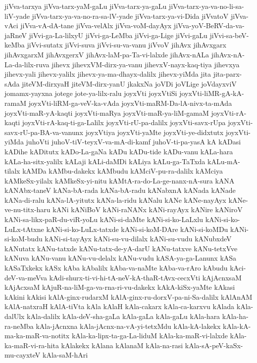 {jiVva-tarxya
jiVva-tarx-yaM-gaLu
jiVva-tarx-ya-gaLu
jiVva-tarx-ya-va-no-li-sa-liV-yade
jiVva-tarx-ya-va-no-ra-sa-lV-yade
jiVva-tarx-ya-vi-Dida
jiVvatoV
jiVva-vAci
jiVva-vA-dA-tane
jiVva-velAlx
jiVva-voM-dayAyx
jiVva-yoV-BeRV-da-va-jaRneV
jiVvi-ga-La-lilxyU
jiVvi-ga-LeMba
jiVvi-ga-Lige
jiVvi-gaLu
jiVvi-sa-beV-keMba
jiVvi-sutatx
jiVvi-suva
jiVvi-su-va-vanu
jiVvoV
jihAvx
jihAvxgarx
jihAvxgarxM
jihAvxgerxV
jihAvx-laM-pa-Ta-vi-lalxde
jihAvx-nALa
jihAvx-nA-La-da-lilx-ruva
jihevx
jihevxVM-dirx-ya-vanu
jihevxV-nayx-kaq-tiya
jihevxya
jihevx-yali
jihevx-yalilx
jihevx-ya-ma-dhayx-dalilx
jihevx-yiMda
jita
jita-parx-sAda
jiteVM-dirxyaH
jiteVM-dirx-yanU
jkakxNa
joVDi
joVLige
joVdayxviV
jomamx-yayxna
jotege
jote-ya-lilx-ralu
joyxVti
joyxVtiSi
joyxVti-liMR-gA-kA-ramaM
joyxVti-liRM-ga-veV-ka-vAda
joyxVti-maRM-Da-lA-nivx-ta-mAda
joyxVti-maR-yA-kaqti
joyxVti-maRya
joyxVti-maR-ya-liM-gamaM
joyxVti-rA-kaqti
joyxVti-rA-kaq-ti-ga-Lalilx
joyxVti-rU-pa-dalilx
joyxVti-savx-rUpa
joyxVti-savx-rU-pa-BA-va-vanunx
joyxVtiya
joyxVti-yaMte
joyxVti-ye-didxtutx
joyxVti-yiMda
juhoVti
juhoV-tiV-teyxV-va-mA-di-kamf
juhoV-ti-pa-yasA
kA
kADasi
kADihe
kADitutx
kADo-La-gaNa
kADu
kADu-tide
kADu-vanu
kALa-hara
kALa-ha-sitx-yalilx
kALaji
kALi-daMDi
kALiya
kALu-ga-TaTxda
kALu-mA-tilalx
kAMDa
kAMbu-dakekx
kAMbudu
kAMciV-pu-ra-dalilx
kAMciya
kAMkeSx-yilalx
kAMkeSx-yi-nitu
kAMtA-ra-do-La-ge-nanx-nA-sura
kANA
kANAbx-taneV
kANa-bA-rada
kANa-bA-radu
kANabxnA
kANada
kANade
kANa-di-ralu
kANa-lA-yitutx
kANa-la-ridu
kANalu
kANe
kANe-nayAyx
kANe-ve-nu-titx-haru
kANi
kANiBoV
kANi-raNANx
kANi-rayAyx
kANire
kANiroV
kANi-sa-likx-paR-du-viR-yoLu
kANi-si-daMte
kANi-si-ko-LaLxlu
kANi-si-ko-LuLx-tAtxne
kANi-si-ko-LuLx-tatxde
kANi-si-koM-DAre
kANi-si-koMDu
kANi-si-koM-budu
kANi-si-tayAyx
kANi-su-vu-dilalx
kANi-su-vudu
kANubxdeV
kANutatx
kANu-tatxde
kANu-tatx-de-yA-darU
kANu-tatxve
kANu-tetxVve
kANuva
kANu-vanu
kANu-vu-delalx
kANu-vudu
kASA-ya-ga-Lanunx
kASa
kASaTxkekx
kASx
kAba
kAbalilx
kAba-va-naMte
kAba-va-rAro
kAbudu
kAci-deV-va-meVva
kAdi-shurx-ti-vi-hi-tA-neV-kA-thaR-tAvx-cecxVti
kAjAcnxsaM
kAjAcxsaM
kAjuR-na-liM-ga-va-rna-ri-vu-dakekx
kAkA-kiSx-yaMte
kAkasi
kAkini
kAkisi
kAlA-ginx-rudarxM
kAlA-ginx-ru-dorxV-pa-ni-Sa-dalilx
kAlAnAM
kAlA-natxraH
kAlA-tiVta
kAla
kAlaH
kAla-cakarx
kAla-ca-karxvu
kAlada
kAla-dalUlx
kAla-dalilx
kAla-deV-sha-gaLa
kAla-gaLa
kAla-gaLu
kAla-hara
kAla-ha-ra-neMba
kAla-jAcnxna
kAla-jAcnx-na-vA-yi-tetxMdu
kAla-kA-lakekx
kAla-kA-ma-ka-maR-va-notitx
kAla-ka-lipx-ta-ga-La-liduM
kAla-ka-maR-vi-lalxde
kAla-ka-maR-vi-ra-hita
kAlakekx
kAlana
kAlanaM
kAla-na-rasi
kAla-sA-peV-kaSx-mu-cayxteV
kAla-saM-hAri
}
